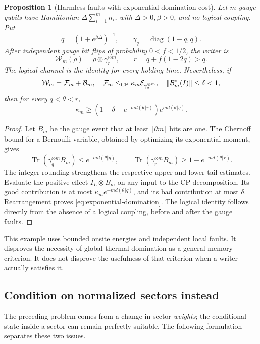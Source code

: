 \documentclass[11pt,reqno]{amsart}
\numberwithin{equation}{section}
\newtheorem{proposition}[theorem]{Proposition}
\theoremstyle{definition}
\theoremstyle{remark}
\newcommand{\Tr}{\operatorname{Tr}}
\newcommand{\Ecal}{\mathcal E}
\newcommand{\Wcal}{\mathcal W}
\DeclarePairedDelimiter{\norm}{\lVert}{\rVert}
\begin{document}
\begin{proposition}[Harmless faults with exponential domination cost]
\label{prop:gauge-faults}
Let \(m\) gauge qubits have Hamiltonian
\(\Delta\sum_{i=1}^m n_i\), with \(\Delta>0,\beta>0\), and no logical
coupling. Put
\[
 q=(1+e^{\beta\Delta})^{-1},\qquad
 \gamma_q=\operatorname{diag}(1-q,q).
\]
After independent gauge bit flips of probability \(0<f<1/2\), the writer is
\[
 \Wcal_m(\rho)=\rho\otimes\gamma_r^{\otimes m},\qquad
                     r=q+f(1-2q)>q.
\]
The logical channel is the identity for every holding time.
Nevertheless, if
\[
 \Wcal_m=\mathcal F_m+\mathcal B_m,\quad
 \mathcal F_m\le_{\mathrm{CP}}\kappa_m\Ecal_{\gamma_q^{\otimes m}},
 \quad \norm{\mathcal B_m^*(I)}\le\delta<1,
\]
then for every \(q<\theta<r\),
\begin{equation}\label{eq:exponential-domination}
 \kappa_m\ge
 \left(1-\delta-e^{-m d(\theta\Vert r)}\right)
                           e^{m d(\theta\Vert q)}.
\end{equation}
\end{proposition}
\begin{proof}
Let \(B_m\) be the gauge event that at least \(\lceil\theta m\rceil\)
bits are one. The Chernoff bound for a Bernoulli variable, obtained by
optimizing its exponential moment, gives
\[
 \Tr(\gamma_q^{\otimes m}B_m)\le e^{-m d(\theta\Vert q)},\qquad
 \Tr(\gamma_r^{\otimes m}B_m)\ge1-e^{-m d(\theta\Vert r)}.
\]
The integer rounding strengthens the respective upper and lower tail
estimates. Evaluate the positive effect \(I_L\otimes B_m\) on any
input to the CP decomposition. Its good contribution is at most
\(\kappa_m e^{-m d(\theta\Vert q)}\), and its bad contribution at
most \(\delta\). Rearrangement proves \eqref{eq:exponential-domination}.
The logical identity follows directly from the absence of a logical
coupling, before and after the gauge faults.
\end{proof}

This example uses bounded onsite energies and independent local faults.
It disproves the necessity of global thermal domination as a general
memory criterion. It does not disprove the usefulness of that criterion
when a writer actually satisfies it.

\subsection{Condition on normalized sectors instead}

The preceding problem comes from a change in sector \emph{weights};
the conditional state inside a sector can remain perfectly suitable.
The following formulation separates these two issues.
\end{document}
